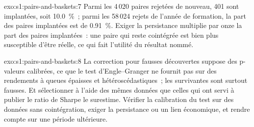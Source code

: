 \begin{solution}{exo:s1:pairs-and-baskets:7}
Parmi les 4\,020 paires rejetées de nouveau, 401 sont implantées, soit 10.0~\%~; parmi les 58\,024 rejets de l'année de formation, la part des paires implantées est de 0.91~\%. Exiger la persistance
multiplie par onze la part des paires implantées~: une paire qui reste cointégrée est bien plus susceptible d'être réelle, ce qui fait l'utilité du résultat nommé.
\end{solution}

\begin{solution}{exo:s1:pairs-and-baskets:8}
La correction pour fausses découvertes suppose des p-valeurs calibrées, ce que le test d'Engle--Granger ne fournit pas sur des rendements à queues épaisses et hétéroscédastiques~; les
survivantes sont surtout fausses. Et sélectionner à l'aide des mêmes données que celles qui ont servi à publier le ratio de Sharpe le surestime. Vérifier la calibration du test sur des données sans
cointégration, exiger la persistance ou un lien économique, et rendre compte sur une période ultérieure.
\end{solution}

